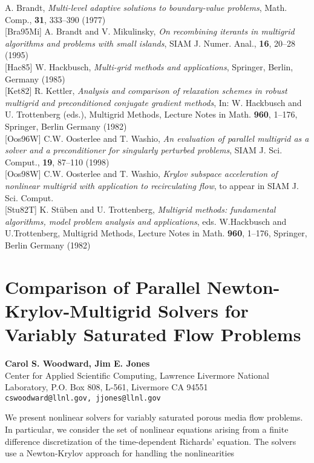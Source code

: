 \documentclass[11pt]{article}
\newcommand{\nextab}[4]{
	\section{#2}
	{\bf #1} \\ \nopagebreak
	{#3} \\ \nopagebreak
	{\tt #4} \nopagebreak
	}
\begin{document}
\noindent
[Bra77] A. Brandt,
        {\em Multi-level adaptive solutions to boundary-value problems},
        Math. Comp., {\bf 31}, 333--390 (1977)
\\{}
[Bra95Mi] A. Brandt and V. Mikulinsky,
          {\em On recombining iterants in multigrid
          algorithms and problems with small islands},
          SIAM J. Numer. Anal., {\bf 16}, 20--28 (1995)
\\{}
[Hac85] W. Hackbusch,
        {\em Multi-grid methods and applications},
        Springer, Berlin, Germany (1985)
\\{}
[Ket82] R. Kettler,
        {\em Analysis and comparison of relaxation schemes in robust
        multigrid and preconditioned conjugate gradient methods},
        In: W. Hackbusch and U. Trottenberg (eds.), Multigrid Methods,
        Lecture Notes in Math. {\bf 960},
	1--176, Springer, Berlin Germany (1982)
\\{}
[Oos96W] C.W. Oosterlee and T. Washio,
         {\em An evaluation of parallel multigrid as
         a solver and a preconditioner for singularly perturbed problems},
         SIAM J. Sci. Comput., {\bf 19},
	 87--110 (1998)
\\{}
[Oos98W] C.W. Oosterlee and T. Washio,
         {\em Krylov subspace acceleration of nonlinear
         multigrid with application to recirculating flow},
         to appear in SIAM J. Sci. Comput.
\\{}
[Stu82T] K. St\"uben and U. Trottenberg,
         {\em Multigrid methods: fundamental algorithms,
         model problem analysis and applications},
         eds. W.Hackbusch and U.Trottenberg,
         Multigrid Methods, Lecture Notes in Math. {\bf 960},
	 1--176, Springer, Berlin Germany (1982)


\pagebreak


\nextab{Carol S. Woodward, Jim E. Jones}
	{Comparison of Parallel Newton-Krylov-Multigrid Solvers for
		Variably Saturated Flow Problems}
	{Center for Applied Scientific Computing,
		Lawrence Livermore National Laboratory,
		P.O. Box 808, L-561, Livermore CA 94551}
	{cswoodward@llnl.gov, jjones@llnl.gov}

We present nonlinear solvers for variably saturated porous media
flow problems.  In particular, we consider the set of nonlinear
equations arising from a finite difference discretization of the
time-dependent Richards' equation.
The solvers use a Newton-Krylov approach for handling the nonlinearities
\end{document}
